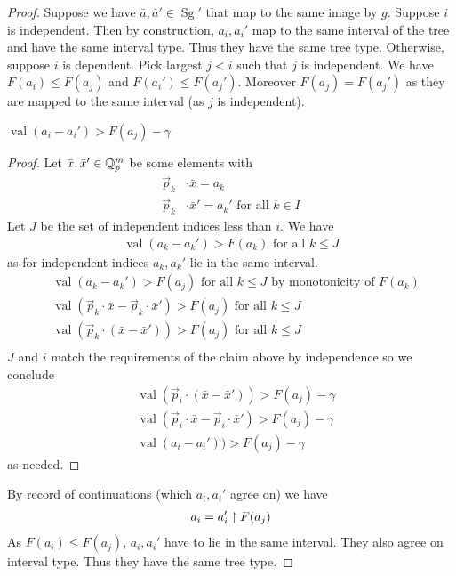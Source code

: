 \documentclass{amsart}
\DeclareMathOperator{\Sg}{Sg}
\DeclareMathOperator{\val}{val}
\begin{document}
\begin{proof}
	Suppose we have $\bar a, \bar a' \in \Sg'$ that map to the same image by $g$.
	Suppose $i$ is independent.
	Then by construction, $a_i, a_i'$ map to the same interval of the tree and have the same interval type.
	Thus they have the same tree type.
	Otherwise, suppose $i$ is dependent.
	Pick largest $j < i$ such that $j$ is independent.
	We have $F(a_i) \leq F(a_j)$ and $F(a_i') \leq F(a_j')$.
	Moreover $F(a_j) = F(a_j')$ as they are mapped to the same interval (as $j$ is independent).
	
	\begin{Claim}
		$\val(a_i - a_i') > F(a_j) - \gamma$
	\end{Claim}
	\begin{proof}
		Let $\bar x, \bar x' \in \mathbb{Q}_p^m$ be some elements with
		\begin{align*}
			\vec p_k &\cdot \bar x = a_k \\
			\vec p_k &\cdot \bar x' = a_k' \text { for all } k \in I
		\end{align*}
		Let $J$ be the set of independent indices less than $i$.
		We have 
		\begin{align*}
			\val(a_k - a_k') > F(a_k) \text { for all } k \leq J
		\end{align*}
		as for independent indices $a_k, a_k'$ lie in the same interval.
		\begin{align*}
			&\val(a_k - a_k') > F(a_j) \text { for all } k \leq J \text{ by monotonicity of $F(a_k)$} \\
			&\val(\vec p_k \cdot \bar x - \vec p_k \cdot \bar x') > F(a_j) \text { for all } k \leq J \\
			&\val(\vec p_k \cdot (\bar x - \bar x')) > F(a_j) \text { for all } k \leq J \\
		\end{align*}
		$J$ and $i$ match the requirements of the claim above by independence so we conclude
		\begin{align*}
			&\val(\vec p_i \cdot (\bar x - \bar x')) > F(a_j) - \gamma \\
			&\val(\vec p_i \cdot \bar x - \vec p_i \cdot \bar x') > F(a_j) - \gamma \\
			&\val(a_i - a_i')) > F(a_j) - \gamma
		\end{align*}
		as needed.
	\end{proof}
	
	By record of continuations (which $a_i, a_i'$ agree on) we have
	\begin{align*}
		a_i = a_i' \upharpoonright F(a_j)
	\end{align*}
	As $F(a_i) \leq F(a_j)$, $a_i, a_i'$ have to lie in the same interval.
	They also agree on interval type.
	Thus they have the same tree type.
	
\end{proof}
\end{document}
